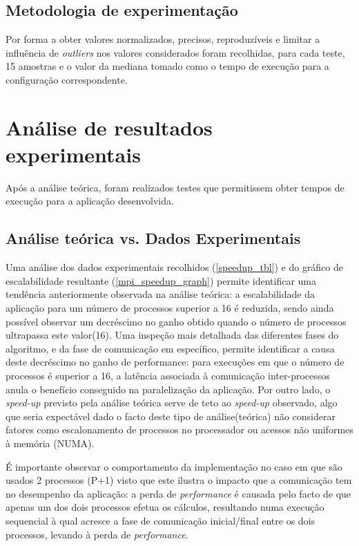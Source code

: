 \documentclass{article}
\begin{document}
\subsection{Metodologia de experimentação}
Por forma a obter valores normalizados, precisos, reproduzíveis e limitar a influência de \textit{outliers} nos valores considerados foram
recolhidas, para cada teste, 15 amostras e o valor da mediana tomado como o tempo de execução para a configuração 
correspondente.

\section{Análise de resultados experimentais} \label{comp}
Após a análise teórica, foram realizados testes que permitissem obter tempos de execução para a aplicação 
desenvolvida. 

\subsection{Análise teórica vs. Dados Experimentais}
Uma análise dos dados experimentais recolhidos (\ref{speedup_tbl}) e do gráfico de escalabilidade resultante
(\ref{mpi_speedup_graph}) permite identificar uma tendência anteriormente observada na análise teórica: a 
escalabilidade da aplicação para um número de processos superior a 16 é reduzida, sendo ainda possível observar um decréscimo no 
ganho obtido quando o número de processos ultrapassa este valor(16). Uma inspeção mais detalhada das diferentes fases 
do algoritmo, e da fase de comunicação em específico, permite identificar a causa deste decréscimo no ganho de 
performance: para execuções em que o número de processos é superior a 16, a latência associada à comunicação 
inter-processos anula o benefício conseguido na paralelização da aplicação. \label{mpi_loss_scalability}
Por outro lado, o \textit{speed-up} previsto pela análise teórica serve de teto ao \textit{speed-up} observado, 
algo que seria expectável dado o facto deste tipo de análise(teórica) não considerar fatores como escalonamento
de processos no processador ou acessos não uniformes à memória (NUMA). 

É importante observar o comportamento da implementação no caso em que são usados 2 processos (P+1) visto que 
este ilustra o impacto que a comunicação tem no desempenho da aplicação: a perda de \textit{performance} é causada
pelo facto de que apenas um dos dois processos efetua os cálculos, resultando numa execução sequencial à qual acresce
a fase de comunicação inicial/final entre os dois processos, levando à perda de \textit{performance}.
\end{document}
